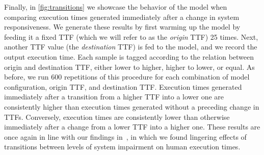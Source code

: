 Finally, in \cref{fig:transitions} we showcase the behavior of the model when comparing execution times generated immediately after a change in system responsiveness.
We generate these results by first warming up the model by feeding it a fixed \gls{TTF} (which we will refer to as the \emph{origin} \gls{TTF}) \num{25} times.
Next, another \gls{TTF} value (the \emph{destination} \gls{TTF}) is fed to the model, and we record the output execution time.
Each sample is tagged according to the relation between origin and destination \gls{TTF}, either lower to higher, higher to lower, or equal.
As before, we run \num{600} repetitions of this procedure for each combination of model configuration, origin \gls{TTF}, and destination \gls{TTF}.
Execution times generated immediately after a transition from a higher \gls{TTF} into a lower one are consistently higher than execution times generated without a preceding change in \glspl{TTF}.
Conversely, execution times are consistently lower than otherwise immediately after a change from a lower \gls{TTF} into a higher one.
These results are once again in line with our findings in~\cite{olguinmunoz2021impact}, in which we found lingering effects of transitions between levels of system impairment on human execution times.


